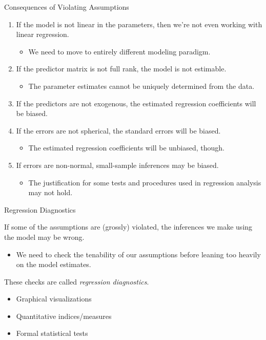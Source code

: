 \documentclass{beamer}\usepackage[]{graphicx}\usepackage[]{color}
\begin{document}

\begin{frame}{Consequences of Violating Assumptions}
  
  \begin{enumerate}
  \item If the model is not linear in the parameters, then we're not even 
    working with linear regression.
    \begin{itemize} 
    \item We need to move to entirely different modeling paradigm.
    \end{itemize}
    \vb
  \item If the predictor matrix is not full rank, the model is not estimable.
    \begin{itemize} 
    \item The parameter estimates cannot be uniquely determined from the data.
    \end{itemize}
    \vb
  \item If the predictors are not exogenous, the estimated regression 
    coefficients will be biased.
    \vb
  \item If the errors are not spherical, the standard errors will be biased.
    \begin{itemize}
    \item The estimated regression coefficients will be unbiased, though.
    \end{itemize}
    \vb
  \item If errors are non-normal, small-sample inferences may be biased.
    \begin{itemize}
    \item The justification for some tests and procedures used in regression 
      analysis may not hold.
    \end{itemize}
  \end{enumerate}
  
\end{frame}


\begin{frame}{Regression Diagnostics}
 
  If some of the assumptions are (grossly) violated, the inferences we make
  using the model may be wrong.  
  \begin{itemize}
  \item We need to check the tenability of our assumptions before leaning too
    heavily on the model estimates.
  \end{itemize}
  \vb
  These checks are called \emph{regression diagnostics}.
  \begin{itemize}
  \item Graphical visualizations
    \vc
  \item Quantitative indices/measures
    \vc
  \item Formal statistical tests
  \end{itemize}
  
\end{frame}
\end{document}
